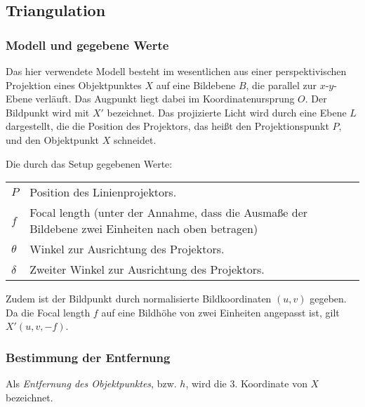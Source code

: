 \documentclass[ngerman,a4paper]{scrartcl}
\begin{document}


\subsection{Triangulation}

\subsubsection{Modell und gegebene Werte}

Das hier verwendete Modell besteht im wesentlichen aus einer perspektivischen Projektion eines Objektpunktes $X$ auf eine Bildebene $B$, die parallel zur $x$-$y$-Ebene verläuft. Das Augpunkt liegt dabei im Koordinatenursprung $O$. Der Bildpunkt wird mit $X'$ bezeichnet. Das projizierte Licht wird durch eine Ebene $L$ dargestellt, die die Position des Projektors, das heißt den Projektionspunkt $P$, und den Objektpunkt $X$ schneidet.

Die durch das Setup gegebenen Werte:

\begin{tabular}{lp{12cm}}
	$P$       & Position des Linienprojektors.\\
	$f$       & Focal length (unter der Annahme, dass die Ausmaße der Bildebene zwei Einheiten nach oben betragen)\\
	$\theta$  & Winkel zur Ausrichtung des Projektors.\\
	$\delta$  & Zweiter Winkel zur Ausrichtung des Projektors.
\end{tabular}

Zudem ist der Bildpunkt durch normalisierte Bildkoordinaten $(u, v)$ gegeben. Da die Focal length $f$ auf eine Bildhöhe von zwei Einheiten angepasst ist, gilt $X'(u, v, -f)$.

\subsubsection{Bestimmung der Entfernung}

Als \emph{Entfernung des Objektpunktes}, bzw. $h$, wird die 3. Koordinate von $X$ bezeichnet.
\end{document}
